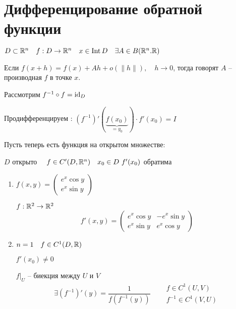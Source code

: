     \section*{Дифференцирование обратной функции}

    $D \subset \mathbb{R}^n \quad f : D \rightarrow \mathbb{R}^n \quad x \in \operatorname{Int} D \quad \exists A \in B(\mathbb{R}^n. \mathbb{R})$
    
    \begin{definition}
        Если $f(x + h) = f(x) + Ah + o(\|h\|), \quad h \rightarrow 0$, тогда говорят $A$ -- производная $f$ в точке $x$.
    \end{definition}

    \begin{figure}[ht]
        \centering
        \label{fig:figurka}
    \end{figure}


    Рассмотрим $f^{-1} \circ f = \operatorname*{id}_D$

    Продифференцируем : $(f^{-1})'(\underbrace{f(x_0)}_{= y_0}) \cdot f'(x_0) = I$

    Пусть теперь есть функция на открытом множестве:

    $D$ открыто $\quad f \in C'(D, \mathbb{R}^n) \quad x _0 \in D \ f'(x_0)$ обратима

    \begin{illustration}\leavevmode
        \begin{enumerate}
            \item $f(x, y) = \begin{pmatrix}e^x \cos y \\ e^x \sin y \end{pmatrix}$
            \par $f : \mathbb{R}^2 \rightarrow \mathbb{R}^2$
            \[
                f'(x, y) = \begin{pmatrix} e^x\cos y & - e^x\sin y \\ e^x\sin y & e^x\cos y \end{pmatrix}    
            \]
            \item $n = 1 \quad f \in C^1(D, \mathbb{R})$
            \par $f'(x_0) \not= 0$
            \par $f\big|_U$ -- биекция между $U$ и $V$
            \[
                \exists (f^{-1})'(y) = \frac{1}{f(f^{-1}(y))} \quad \begin{aligned} &f \in C^1(U, V) \\ &f^{-1} \in C^1(V, U) \end{aligned}    
            \]
        \end{enumerate}
    \end{illustration}

